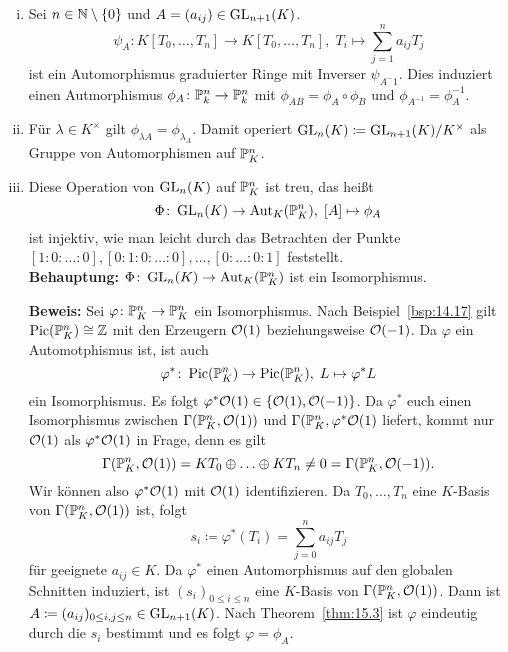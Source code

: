 \begin{bsp}
\label{bsp:15.4}
	\begin{enumerate}[i)]
		\item Sei $n \in \N \setminus\{0\}$ und $A=(a_{ij})\in \GL_{n+1}(K)$.
		\[
			\psi_A\colon K[T_0,\ldots,T_n]\to K[T_0,\ldots,T_n], \; T_i \mapsto \sum_{j=1}^na_{ij}T_j
		\]
		ist ein Automorphismus graduierter Ringe mit Inverser $\psi_{A^-1}$. Dies induziert einen Autmorphismus $\phi_A \colon \P_k^n \to \P_k^n$ mit $\phi_{AB} = \phi_A \circ \phi_B$ und $\phi_{A^{-1}} = \phi_A^{-1}$.
		\item Für $\lambda \in K^\times$ gilt $\phi_{\lambda A} = \phi_{\lambda_A}$. Damit operiert $\PGL_n(K)\coloneqq \GL_{n+1}(K)/K^\times$ als Gruppe von Automorphismen auf $\P^n_K$.
		\item Diese Operation von $\PGL_n(K)$ auf $\P^n_K$ ist treu, das heißt
		\[
			\Phi\colon \PGL_n(K) \to \Aut_K(\P^n_K),\; [A]\mapsto \phi_A
		\]
		ist injektiv, wie man leicht durch das Betrachten der Punkte $[1:0:\ldots:0],[0:1:0:\ldots:0],\ldots,[0:\ldots:0:1]$ feststellt.\\
		\textbf{Behauptung:} $\Phi\colon \PGL_n(K)\to \Aut_K(\P^n_K)$ ist ein Isomorphismus.

		\textbf{Beweis:} Sei $\varphi\colon \P^n_K\to \P^n_K$ ein Isomorphismus. Nach Beispiel~\ref{bsp:14.17} gilt $\Pic(\P^n_K)\cong \Z$ mit den Erzeugern $\mco(1)$ beziehungsweise $\mco(-1)$. Da $\varphi$ ein Automotphismus ist, ist auch
		\[
			\varphi^*\colon \Pic(\P^n_K)\to \Pic(\P^n_K),\; L \mapsto \varphi^*L
		\]
		ein Isomorphismus. Es folgt $\varphi^*\mco(1) \in \{\mco(1),\mco(-1)\}$. Da $\varphi^*$ euch einen Isomorphismus zwischen $\Gamma(\P^n_K,\mco(1))$ und $\Gamma(\P^n_K,\varphi^*\mco(1)$ liefert, kommt nur $\mco(1)$ als $\varphi^*\mco(1)$ in Frage, denn es gilt
		\[
			\Gamma(\P^n_K,\mco(1)) = KT_0\oplus \ldots \oplus KT_n \ne 0 = \Gamma(\P^n_K,\mco(-1)).
		\]
		Wir können also $\varphi^*\mco(1)$ mit $\mco(1)$ identifizieren. Da $T_0,\ldots,T_n$ eine $K$-Basis von $\Gamma(\P^n_K,\mco(1))$ ist, folgt
		\[
			s_i\coloneqq \varphi^*(T_i) = \sum_{j=0}^n a_{ij}T_j
		\]
		für geeignete $a_{ij} \in K$. Da $\varphi^*$ einen Automorphismus auf den globalen Schnitten induziert, ist $(s_i)_{0 \le i \le n}$ eine $K$-Basis von $\Gamma(\P^n_K,\mco(1))$. Dann ist $A \coloneqq (a_{ij})_{0\le i,j \le n} \in \GL_{n+1}(K)$. Nach Theorem~\ref{thm:15.3} ist $\varphi$ eindeutig durch die $s_i$ bestimmt und es folgt $\varphi = \phi_A$.
	\end{enumerate}
\end{bsp}

